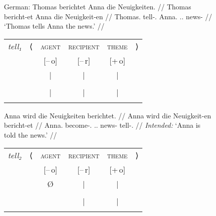 \begin{figure}
\pex\label{ex:gerditrpass}%
German:
\a\label{ex:gerditrpass_act}%
\begingl
	\gla Thomas berichtet Anna die Neuigkeiten. //
	\glb Thomas bericht-et Anna die Neuigkeit-en //
	\glc Thomas.\Nom{} tell-\Tsg{}.\Prs{} Anna.\Dat{} \Def{}.\Acc{}.\Pl{}
		news-\Pl{} //
	\glft `Thomas tells Anna the news.' //
\endgl
\medskip\\
\begin{tabular}[t]{@{} >{\itshape}l l c c c r}
tell₁
	& ⟨
	& \textsc{agent}
	& \textsc{recipient}
	& \textsc{theme}
	& ⟩
	\\
%
	& %
	& [–\,o]
	& [–\,r]
	& [+\,o]
	& %
	\\

%
	& %
	& |
	& |
	& |
	& %
	\\

%
	& %
	& \Subj
	& \Obj
	& \SObj
	& %
	\\

%
	& %
	& |
	& |
	& |
	& %
	\\

%
	& %
	& \fw{Thomas}
	& \fw{Anna}
	& \fw{news}
	& %
	\\
\end{tabular}

\a\label{ex:gerditrpass_pass1}%
\ljudge*\begingl
	\gla Anna wird die Neuigkeiten berichtet. //
	\glb Anna wird die Neuigkeit-en bericht-et //
	\glc Anna.\Nom{} become-\Tsg{}.\Prs{} \Def{}.\Acc{}.\Pl{} news-\Pl{}
		tell-\Pst{}.\Ptcp{} //
	\glft \textit{Intended:} `Anna is told the news.' //
\endgl
\medskip\\
\begin{tabular}[t]{@{} >{\itshape}l l c c c r}
tell₂
	& ⟨
	& \textsc{agent}
	& \textsc{recipient}
	& \textsc{theme}
	& ⟩
	\\
%
	& %
	& [–\,o]
	& [–\,r]
	& [+\,o]
	& %
	\\

%
	& %
	& Ø
	& |
	& |
	& %
	\\

%
	& %
	& %
	& \Subj
	& \Obj
	& %
	\\

%
	& %
	& %
	& |
	& |
	& %
	\\

%
	& %
	& %
	& \fw{Anna}
	& \fw{news}
	& %
	\\
\end{tabular}


\end{figure}
